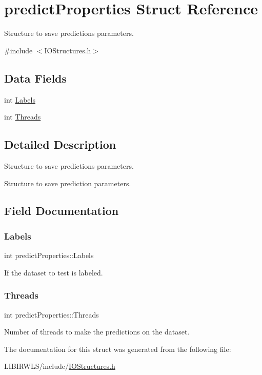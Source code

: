 \hypertarget{structpredictProperties}{}\section{predict\+Properties Struct Reference}
\label{structpredictProperties}


Structure to save predictions parameters.  




{\ttfamily \#include $<$I\+O\+Structures.\+h$>$}

\subsection*{Data Fields}
\begin{DoxyCompactItemize}
\item 
int \hyperlink{structpredictProperties_a580276e3e15305d5ac16d9ce0eb9b20a}{Labels}
\item 
int \hyperlink{structpredictProperties_a602116e0d46424243cb4c971c03695e1}{Threads}
\end{DoxyCompactItemize}


\subsection{Detailed Description}
Structure to save predictions parameters. 

Structure to save prediction parameters. 

\subsection{Field Documentation}
\hypertarget{structpredictProperties_a580276e3e15305d5ac16d9ce0eb9b20a}{}\label{structpredictProperties_a580276e3e15305d5ac16d9ce0eb9b20a} 
\subsubsection{\texorpdfstring{Labels}{Labels}}
{\ttfamily int predict\+Properties\+::\+Labels}

If the dataset to test is labeled. \hypertarget{structpredictProperties_a602116e0d46424243cb4c971c03695e1}{}\label{structpredictProperties_a602116e0d46424243cb4c971c03695e1} 
\subsubsection{\texorpdfstring{Threads}{Threads}}
{\ttfamily int predict\+Properties\+::\+Threads}

Number of threads to make the predictions on the dataset. 

The documentation for this struct was generated from the following file\+:\begin{DoxyCompactItemize}
\item 
L\+I\+B\+I\+R\+W\+L\+S/include/\hyperlink{IOStructures_8h}{I\+O\+Structures.\+h}\end{DoxyCompactItemize}
